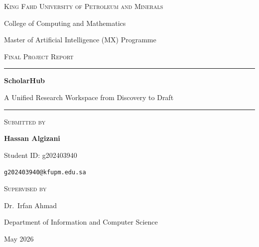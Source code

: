 \begin{titlepage}
\centering

\vspace*{0.5cm}

{\Large \textsc{King Fahd University of Petroleum and Minerals}\par}
\vspace{0.3cm}
{\large College of Computing and Mathematics\par}
\vspace{0.2cm}
{\large Master of Artificial Intelligence (MX) Programme\par}

\vfill

{\small\textsc{Final Project Report}\par}
\vspace{1cm}

\rule{\textwidth}{1.2pt}\par
\vspace{0.5cm}

{\Huge\bfseries ScholarHub\par}
\vspace{0.5cm}
{\Large A Unified Research Workspace from Discovery to Draft\par}
\vspace{0.5cm}

\rule{\textwidth}{1.2pt}\par

\vfill

\begin{flushleft}
\textsc{Submitted by}\par
\vspace{0.3cm}
{\large\bfseries Hassan Algizani\par}
{\normalsize Student ID: g202403940\par}
{\normalsize \texttt{g202403940@kfupm.edu.sa}\par}
\end{flushleft}

\vspace{1cm}

\begin{flushleft}
\textsc{Supervised by}\par
\vspace{0.3cm}
{\large Dr.~Irfan Ahmad\par}
{\normalsize Department of Information and Computer Science\par}
\end{flushleft}

\vfill

{\large May 2026\par}

\end{titlepage}
